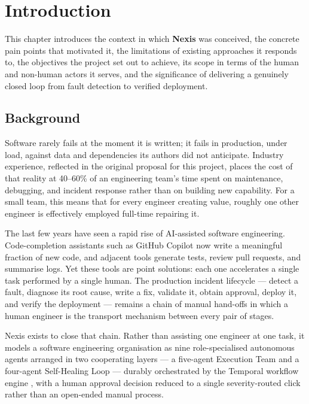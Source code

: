 \chapter{Introduction}

This chapter introduces the context in which \textbf{Nexis} was conceived, the
concrete pain points that motivated it, the limitations of existing approaches
it responds to, the objectives the project set out to achieve, its scope in
terms of the human and non-human actors it serves, and the significance of
delivering a genuinely closed loop from fault detection to verified deployment.

\section{Background}

Software rarely fails at the moment it is written; it fails in production,
under load, against data and dependencies its authors did not anticipate.
Industry experience, reflected in the original proposal for this project,
places the cost of that reality at 40--60\% of an engineering team's time
spent on maintenance, debugging, and incident response rather than on building
new capability. For a small team, this means that for every engineer creating
value, roughly one other engineer is effectively employed full-time repairing
it.

The last few years have seen a rapid rise of AI-assisted software engineering.
Code-completion assistants such as GitHub Copilot \cite{copilot} now write a
meaningful fraction of new code, and adjacent tools generate tests, review
pull requests, and summarise logs. Yet these tools are point solutions: each
one accelerates a single task performed by a single human. The production
incident lifecycle --- detect a fault, diagnose its root cause, write a fix,
validate it, obtain approval, deploy it, and verify the deployment --- remains
a chain of manual hand-offs in which a human engineer is the transport
mechanism between every pair of stages.

Nexis exists to close that chain. Rather than assisting one engineer at one
task, it models a software engineering organisation as nine role-specialised
autonomous agents arranged in two cooperating layers --- a five-agent Execution
Team and a four-agent Self-Healing Loop --- durably orchestrated by the
Temporal workflow engine \cite{temporal}, with a human approval decision
reduced to a single severity-routed click rather than an open-ended manual
process.

